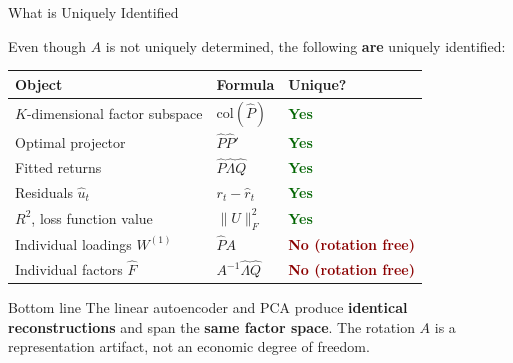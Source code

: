 \documentclass[aspectratio=169, 10pt]{beamer}
\newcommand{\Phat}{\hat{P}}
\newcommand{\Lhat}{\hat{\Lambda}}
\newcommand{\Qhat}{\hat{Q}}
\newcommand{\Wone}{W^{(1)}}
\begin{document}
\begin{frame}{What is Uniquely Identified}

Even though $A$ is not uniquely determined, the following \textbf{are} uniquely identified:

\bigskip
\begin{center}
\begin{tabular}{lll}
\toprule
\textbf{Object} & \textbf{Formula} & \textbf{Unique?} \\
\midrule
$K$-dimensional factor subspace & $\mathrm{col}(\Phat)$ & \textcolor{darkgreen}{\textbf{Yes}} \\
Optimal projector                & $\Phat\Phat'$         & \textcolor{darkgreen}{\textbf{Yes}} \\
Fitted returns                   & $\Phat\Lhat\Qhat$     & \textcolor{darkgreen}{\textbf{Yes}} \\
Residuals $\hat{u}_t$            & $r_t - \hat{r}_t$     & \textcolor{darkgreen}{\textbf{Yes}} \\
$R^2$, loss function value       & $\|U\|_F^2$           & \textcolor{darkgreen}{\textbf{Yes}} \\
\midrule
Individual loadings $\Wone$      & $\Phat A$             & \textcolor{darkred}{\textbf{No (rotation free)}} \\
Individual factors $\hat{F}$     & $A^{-1}\Lhat\Qhat$   & \textcolor{darkred}{\textbf{No (rotation free)}} \\
\bottomrule
\end{tabular}
\end{center}

\bigskip
\begin{block}{Bottom line}
The linear autoencoder and PCA produce \textbf{identical reconstructions} and span the
\textbf{same factor space}. The rotation $A$ is a representation artifact, not an
economic degree of freedom.
\end{block}

\end{frame}
\end{document}
